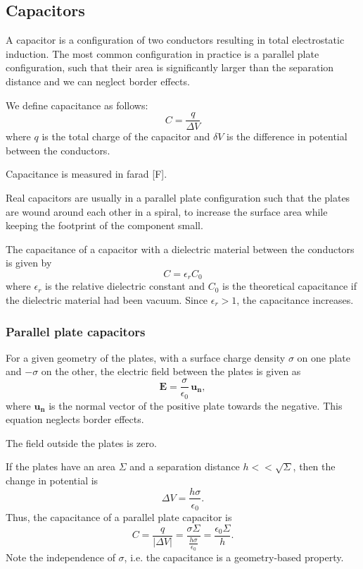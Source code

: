 \documentclass[a4paper, 12pt]{article}
\renewcommand{\vec}[1]{\mathbf{#1}}
\newcommand{\E}{\ensuremath{\vec{E}}}
\newcommand{\e}{\ensuremath{\epsilon_0}}
\begin{document}
    \subsection{Capacitors}
    A capacitor is a configuration of two conductors resulting in total electrostatic induction. 
    The most common configuration in practice is a parallel plate configuration, 
    such that their area is significantly larger than the separation distance and we can neglect border effects.
    
    We define capacitance as follows:
    \begin{equation}
        C = \frac{q}{\Delta V}
    \end{equation}
    where $q$ is the total charge of the capacitor and $\delta V$ is the difference in potential between the conductors.
    
    Capacitance is measured in farad [F].
    
    Real capacitors are usually in a parallel plate configuration such that the plates are wound around each other in a spiral, 
    to increase the surface area while keeping the footprint of the component small.
    
    The capacitance of a capacitor with a dielectric material between the conductors is given by
    \begin{equation}
        C = \epsilon_rC_0
    \end{equation}
    where $\epsilon_r$ is the relative dielectric constant and $C_0$ is the theoretical capacitance 
    if the dielectric material had been vacuum. Since $\epsilon_r > 1$, the capacitance increases.
    
    \subsubsection{Parallel plate capacitors}
        For a given geometry of the plates, with a surface charge density $\sigma$ on one plate and $-\sigma$ on the other, 
        the electric field between the plates is given as 
        \begin{equation}
            \E = \frac{\sigma}{\e}\,\vec{u_n},
        \end{equation}
        where $\vec{u_n}$ is the normal vector of the positive plate towards the negative. This equation neglects border effects.
        
        The field outside the plates is zero.
        
        If the plates have an area $\Sigma$ and a separation distance $h << \sqrt{\Sigma}$, then the change in potential is
        \begin{equation}
            \Delta V = \frac{h\sigma}{\e}.
        \end{equation}
        Thus, the capacitance of a parallel plate capacitor is
        \begin{equation}
            C = \frac{q}{|\Delta V|} = \frac{\sigma \Sigma}{\frac{h\sigma}{\e}} = \frac{\e \Sigma}{h}.
        \end{equation}
        Note the independence of $\sigma$, i.e. the capacitance is a geometry-based property.
\end{document}
